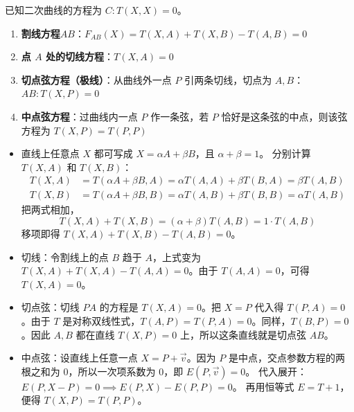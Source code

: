 \begin{conclusion}[直线的几个基本方程]
已知二次曲线的方程为 ${C}: T(X,X)=0$。
\begin{enumerate}
    \item \textbf{割线方程$AB$}：$ F_{AB}(X) = T(X,A) + T(X,B) - T(A,B) = 0 $
    \item \textbf{点 $A$ 处的切线方程}：$ T(X,A) = 0 $
    \item \textbf{切点弦方程（极线）}：从曲线外一点 $P$ 引两条切线，切点为 $A,B$：$AB: T(X,P) = 0 $
    \item \textbf{中点弦方程}：过曲线内一点 $P$ 作一条弦，若 $P$ 恰好是这条弦的中点，则该弦方程为 $T(X,P) = T(P,P)$
\end{enumerate}
\end{conclusion}
\begin{itemize}
\item 直线上任意点 $X$ 都可写成 $X = \alpha A + \beta B$，且 $\alpha + \beta = 1$。
分别计算 $T(X,A)$ 和 $T(X,B)$：
\begin{align*}
    T(X,A) &= T(\alpha A + \beta B, A) = \alpha T(A,A) + \beta T(B,A) = \beta T(A,B) \\
    T(X,B) &= T(\alpha A + \beta B, B) = \alpha T(A,B) + \beta T(B,B) = \alpha T(A,B)
\end{align*}
把两式相加，
$$ T(X,A) + T(X,B) = (\alpha + \beta) T(A,B) = 1 \cdot T(A,B) $$
移项即得 $T(X,A) + T(X,B) - T(A,B) = 0$。
\item 切线：令割线上的点 $B$ 趋于 $A$，上式变为 $T(X,A) + T(X,A) - T(A,A) = 0$。由于 $T(A,A)=0$，可得 $T(X,A) = 0$。
\item 切点弦：切线 $PA$ 的方程是 $T(X,A)=0$。把 $X=P$ 代入得 $T(P,A)=0$。由于 $T$ 是对称双线性式，$T(A,P)=T(P,A)=0$。同样，$T(B,P)=0$。因此 $A,B$ 都在直线 $T(X,P)=0$ 上，所以这条直线就是切点弦 $AB$。
\item 中点弦：设直线上任意一点 $X = P + \vec{v}$。因为 $P$ 是中点，交点参数方程的两根之和为 $0$，所以一次项系数为 $0$，即 $E(P, \vec{v}) = 0$。
代入展开：$E(P, X-P) = 0 \implies E(P,X) - E(P,P) = 0$。
再用恒等式 $E = T + 1$，便得 $T(X,P) = T(P,P)$。
\end{itemize}

